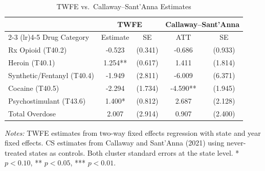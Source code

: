 \begin{table}[H]
\centering
\caption{TWFE vs.\ Callaway--Sant'Anna Estimates}
\begin{threeparttable}
\begin{tabular}{lcccc}
\toprule
& \multicolumn{2}{c}{TWFE} & \multicolumn{2}{c}{Callaway--Sant'Anna} \\
\cmidrule(lr){2-3} \cmidrule(lr){4-5}
Drug Category & Estimate & SE & ATT & SE \\
\midrule
Rx Opioid (T40.2) & -0.523 & (0.341) & -0.686 & (0.933) \\
Heroin (T40.1) & 1.254** & (0.617) & 1.411 & (1.814) \\
Synthetic/Fentanyl (T40.4) & -1.949 & (2.811) & -6.009 & (6.371) \\
Cocaine (T40.5) & -2.294 & (1.734) & -4.590** & (1.945) \\
Psychostimulant (T43.6) & 1.400* & (0.812) & 2.687 & (2.128) \\
Total Overdose & 2.007 & (2.914) & 0.907 & (2.400) \\
\bottomrule
\end{tabular}
\begin{tablenotes}[flushleft]
\small
\item \textit{Notes:} TWFE estimates from two-way fixed effects regression with state and year fixed effects. CS estimates from Callaway and Sant'Anna (2021) using never-treated states as controls. Both cluster standard errors at the state level. * $p<0.10$, ** $p<0.05$, *** $p<0.01$.
\end{tablenotes}
\end{threeparttable}
\label{tab:twfe_vs_cs}
\end{table}
